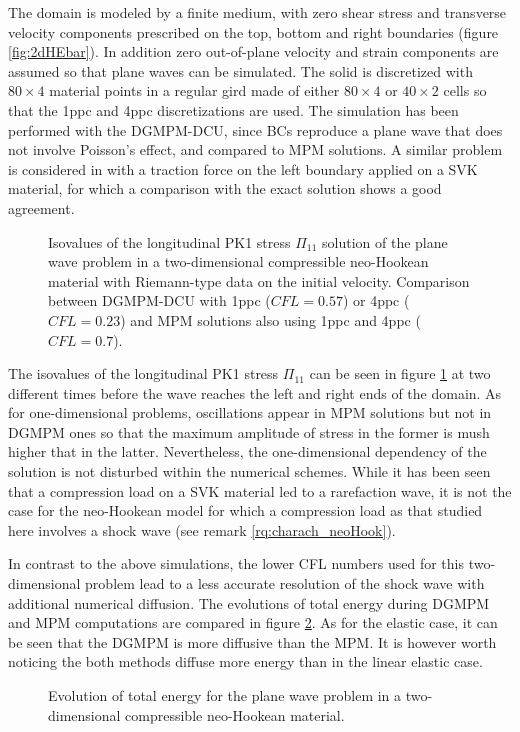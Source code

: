 The domain is modeled by a finite medium, with zero shear stress and transverse velocity components prescribed on the top, bottom and right boundaries (figure \ref{fig:2dHEbar}).
In addition zero out-of-plane velocity and strain components are assumed so that plane waves can be simulated.
The solid is discretized with $80\times 4$ material points in a regular gird made of either $80\times 4$ or $40\times 2$ cells so that the 1ppc and 4ppc discretizations are used.
The simulation has been performed with the DGMPM-DCU, since BCs reproduce a plane wave that does not involve Poisson's effect, and compared to MPM solutions. A similar problem is considered in \cite{DGMPM} with a traction force on the left boundary applied on a SVK material, for which a comparison with the exact solution shows a good agreement.
\begin{figure}[h!]
  \centering
  
  \caption{Isovalues of the longitudinal PK1 stress $\Pi_{11}$ solution of the plane wave problem in a two-dimensional compressible neo-Hookean material with Riemann-type data on the initial velocity. Comparison between DGMPM-DCU with 1ppc ($CFL=0.57$) or 4ppc ($CFL=0.23$) and MPM solutions also using 1ppc and 4ppc ($CFL=0.7$).}
  \label{fig:2dplane_Wave}
\end{figure}

The isovalues of the longitudinal PK1 stress $\Pi_{11}$ can be seen in figure \ref{fig:2dplane_Wave} at two different times before the wave reaches the left and right ends of the domain.
As for one-dimensional problems, oscillations appear in MPM solutions but not in DGMPM ones so that the maximum amplitude of stress in the former is mush higher that in the latter.
Nevertheless, the one-dimensional dependency of the solution is not disturbed within the numerical schemes.
While it has been seen that a compression load on a SVK material led to a rarefaction wave, it is not the case for the neo-Hookean model for which a compression load as that studied here involves a shock wave (see remark \ref{rq:charach_neoHook}).

In contrast to the above simulations, the lower CFL numbers used for this two-dimensional problem lead to a less accurate resolution of the shock wave with additional numerical diffusion.
The evolutions of total energy during DGMPM and MPM computations are compared in figure \ref{fig:pw_energy}. As for the elastic case, it can be seen that the DGMPM is more diffusive than the MPM. It is however worth noticing the both methods diffuse more energy than in the linear elastic case. 
\begin{figure}[h!]
  \centering
  
  \caption{Evolution of total energy for the plane wave problem in a two-dimensional compressible neo-Hookean material.}
  \label{fig:pw_energy}
\end{figure}

